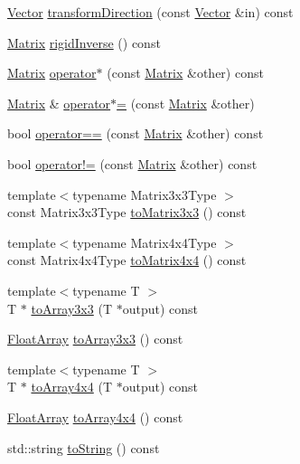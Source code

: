 \begin{DoxyCompactItemize}
\item 
\hyperlink{struct_leap_1_1_vector}{Vector} \hyperlink{struct_leap_1_1_matrix_a9c0e8a9d20bda205de7cfc3165bdac17}{transform\+Direction} (const \hyperlink{struct_leap_1_1_vector}{Vector} \&in) const 
\item 
\hyperlink{struct_leap_1_1_matrix}{Matrix} \hyperlink{struct_leap_1_1_matrix_a735ebc49019c01ea410fe57bae028b65}{rigid\+Inverse} () const 
\item 
\hyperlink{struct_leap_1_1_matrix}{Matrix} \hyperlink{struct_leap_1_1_matrix_a89acc12c61096488b67b2a22d54dde3f}{operator$\ast$} (const \hyperlink{struct_leap_1_1_matrix}{Matrix} \&other) const 
\item 
\hyperlink{struct_leap_1_1_matrix}{Matrix} \& \hyperlink{struct_leap_1_1_matrix_a44df5bc99d32339961cd0f923c516dcd}{operator$\ast$=} (const \hyperlink{struct_leap_1_1_matrix}{Matrix} \&other)
\item 
bool \hyperlink{struct_leap_1_1_matrix_aa68d4cb00dbb94ce05e59529cb2906ca}{operator==} (const \hyperlink{struct_leap_1_1_matrix}{Matrix} \&other) const 
\item 
bool \hyperlink{struct_leap_1_1_matrix_aafdeab2849c0d090e2a792af0effeee7}{operator!=} (const \hyperlink{struct_leap_1_1_matrix}{Matrix} \&other) const 
\item 
{\footnotesize template$<$typename Matrix3x3\+Type $>$ }\\const Matrix3x3\+Type \hyperlink{struct_leap_1_1_matrix_a428b8695567bd20a1d219ac35043ce8c}{to\+Matrix3x3} () const 
\item 
{\footnotesize template$<$typename Matrix4x4\+Type $>$ }\\const Matrix4x4\+Type \hyperlink{struct_leap_1_1_matrix_ae9172c47f31edead4fa45bbebae2cea8}{to\+Matrix4x4} () const 
\item 
{\footnotesize template$<$typename T $>$ }\\T $\ast$ \hyperlink{struct_leap_1_1_matrix_a21df9755f18951876d85b23c5a9cc5dd}{to\+Array3x3} (T $\ast$output) const 
\item 
\hyperlink{struct_leap_1_1_float_array}{Float\+Array} \hyperlink{struct_leap_1_1_matrix_a17f08b5c73e7fe7bbe7687c640f2cd36}{to\+Array3x3} () const 
\item 
{\footnotesize template$<$typename T $>$ }\\T $\ast$ \hyperlink{struct_leap_1_1_matrix_a2a381fc85634accb9e3d5e0ffece00b1}{to\+Array4x4} (T $\ast$output) const 
\item 
\hyperlink{struct_leap_1_1_float_array}{Float\+Array} \hyperlink{struct_leap_1_1_matrix_a9c5e15612049d07651b5f0ba8237a8b6}{to\+Array4x4} () const 
\item 
std\+::string \hyperlink{struct_leap_1_1_matrix_ab9fe6da506d7a56777d85877178c7907}{to\+String} () const 
\end{DoxyCompactItemize}
